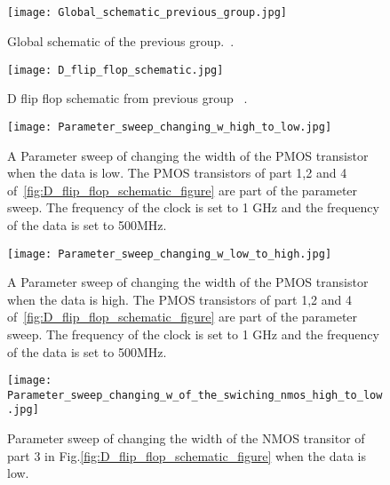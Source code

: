 \begin{appendices}
\section{}\label{sec:appendix}
\begin{figure}[h]
\texttt{[image: Global\_schematic\_previous\_group.jpg]}
\caption{Global schematic of the previous group.~\cite{powerdac}.}
\label{fig:Global_schematic_previous_group_figure}
\end{figure}

\begin{figure}[h]
 \texttt{[image: D\_flip\_flop\_schematic.jpg]}
 \caption{ D flip flop schematic from previous group ~\cite{powerdac}.}
 \label{fig:D_flip_flop_ previous_group_figure}
\end{figure}

\begin{figure}[h]
 \texttt{[image: Parameter\_sweep\_changing\_w\_high\_to\_low.jpg]}
 \caption{A Parameter sweep of changing the width of the PMOS transistor when the data is low. The PMOS transistors of part 1,2 and 4 of~\ref{fig:D_flip_flop_schematic_figure} are part of the parameter sweep. The frequency of the clock is set to 1 GHz and the frequency of the data is set to 500MHz.} 
 \label{fig:parametersweep_changing_w_high_to_low_figure}
\end{figure}

\begin{figure}[h]
 \texttt{[image: Parameter\_sweep\_changing\_w\_low\_to\_high.jpg]}
 \caption{A Parameter sweep of changing the width of the PMOS transistor when the data is high. The PMOS transistors of part 1,2 and 4 of~\ref{fig:D_flip_flop_schematic_figure} are part of the parameter sweep. The frequency of the clock is set to 1 GHz and the frequency of the data is set to 500MHz.}
 \label{fig:parametersweep_changing_w_low_to_high_figure}
\end{figure}

\begin{figure}[h]
 \texttt{[image: Parameter\_sweep\_changing\_w\_of\_the\_swiching\_nmos\_high\_to\_low.jpg]}
 \caption{Parameter sweep of changing the width of the NMOS transitor of part 3 in Fig.\ref{fig:D_flip_flop_schematic_figure} when the data is low.}
 \label{fig:Parameter_sweep_changing_w_of_the_swiching_nmos_high_to_low_figure}
\end{figure}


\end{appendices}
